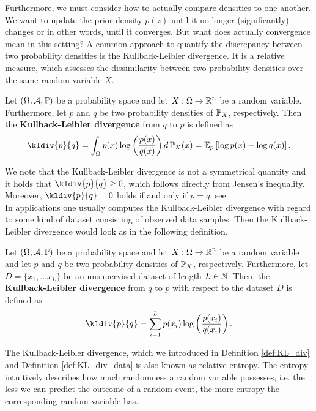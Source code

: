 Furthermore, we must consider how to actually compare densities to one another. We want to update the prior density $p(z)$ until it \glqq no longer (significantly) changes\grqq{} or in other words, until it converges. But what does actually convergence mean in this setting? A common approach to quantify the discrepancy between two probability densities is the Kullback-Leibler divergence. It is a relative measure, which assesses the dissimilarity between two probability densities over the same random variable $X$.

\begin{definition}\label{def:KL_div}
Let $(\Omega,\operatorname{\mathcal{A}}, \operatorname{\mathbb{P}})$ be a probability space and let $X:\Omega \to \operatorname{\mathbb{R}}^n$ be a random variable. Furthermore, let $p$ and $q$ be two probability densities of $\operatorname{\mathbb{P}}_X$, respectively. Then the \textbf{Kullback-Leibler divergence} from $q$ to $p$ is defined as
\begin{align}
\kldiv{p}{q} = \int_\O p(x) \log \left( \frac{p(x)}{q(x)}\right) d\prob_X(x) = \E_p \left[\log p(x) - \log q(x) \right].
\end{align}
\end{definition}

We note that the Kullback-Leibler divergence is not a symmetrical quantity and it holds that $\kldiv{p}{q}\geq 0$, which follows directly from Jensen's inequality. Moreover, $\kldiv{p}{q} = 0$ holds if and only if $p = q$, see \cite[Section~23.3]{klenke2013probability}.\\
In applications one usually computes the Kullback-Leibler divergence with regard to some kind of dataset consisting of observed data samples. Then the Kullback-Leibler divergence would look as in the following definition.

\begin{definition}\label{def:KL_div_data}
Let $(\Omega,\operatorname{\mathcal{A}}, \operatorname{\mathbb{P}})$ be a probability space and let $X:\Omega \to \operatorname{\mathbb{R}}^n$ be a random variable and let $p$ and $q$ be two probability densities of $\operatorname{\mathbb{P}}_X$, respectively. Furthermore, let $D=\{x_1, \ldots x_L\}$ be an unsupervised dataset of length $L\in\operatorname{\mathbb{N}}$. Then, the \textbf{Kullback-Leibler divergence} from $q$ to $p$ with respect to the dataset $D$ is defined as
\begin{align}
\kldiv{p}{q} = \sum_{i=1}^L p(x_i) \log \left( \frac{p(x_i)}{q(x_i)}\right).
\end{align}
\end{definition}

The Kullback-Leibler divergence, which we introduced in Definition \ref{def:KL_div} and Definition \ref{def:KL_div_data} is also known as relative entropy. The entropy intuitively describes how much \glqq randomness\grqq{} a random variable possesses, i.e. the less we can predict the outcome of a random event, the more entropy the corresponding random variable has.

